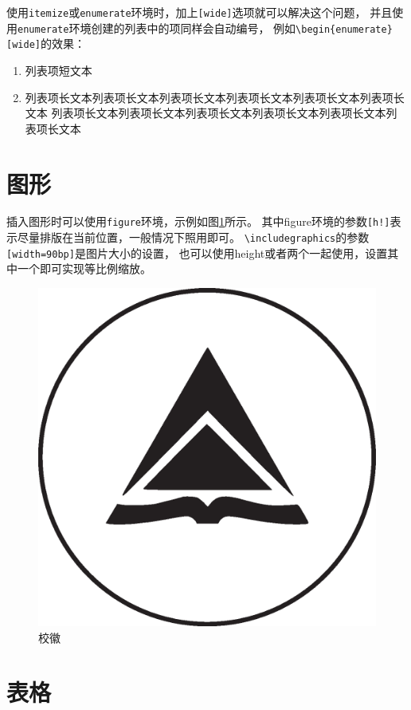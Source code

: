 使用\verb|itemize|或\verb|enumerate|环境时，加上\verb|[wide]|选项就可以解决这个问题，
并且使用\verb|enumerate|环境创建的列表中的项同样会自动编号，
例如\verb|\begin{enumerate}[wide]|的效果：

\begin{enumerate}[wide]
\item 列表项短文本
\item 列表项长文本列表项长文本列表项长文本列表项长文本列表项长文本列表项长文本
列表项长文本列表项长文本列表项长文本列表项长文本列表项长文本列表项长文本
\end{enumerate}

\section{图形}
\label{sec-figure}
插入图形时可以使用\texttt{figure}环境，示例如图\ref{fig-sample}所示。
其中figure环境的参数\verb|[h!]|表示尽量排版在当前位置，一般情况下照用即可。
\verb|\includegraphics|的参数\verb|[width=90bp]|是图片大小的设置，
也可以使用height或者两个一起使用，设置其中一个即可实现等比例缩放。
\begin{figure}[h!]
    \centering
    \includegraphics[width=90bp]{preset/figure/logo.eps}
    \caption{校徽}
    \label{fig-sample}
\end{figure}

\section{表格}
\label{sec-table}

